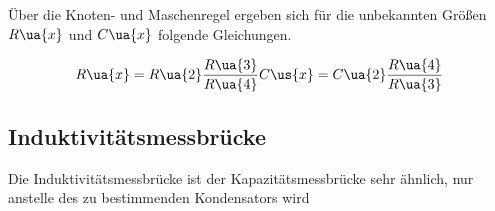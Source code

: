 Über die Knoten- und Maschenregel ergeben sich für die unbekannten Größen
$R\ua{x}$ und $C\ua{x}$ folgende Gleichungen.

\begin{equation}
  R\ua{x} = R\ua{2}\frac{R\ua{3}}{R\ua{4}}
  C\us{x} = C\ua{2}\frac{R\ua{4}}{R\ua{3}}
\end{equation}

\subsection{Induktivitätsmessbrücke}

Die Induktivitätsmessbrücke ist der Kapazitätsmessbrücke sehr ähnlich, nur anstelle
des zu bestimmenden Kondensators wird 


